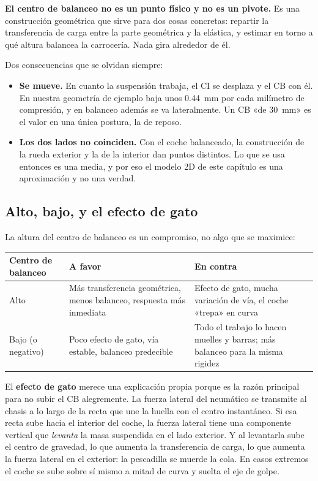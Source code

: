 \begin{ojo}
\textbf{El centro de balanceo no es un punto físico y no es un pivote.} Es una
construcción geométrica que sirve para dos cosas concretas: repartir la
transferencia de carga entre la parte geométrica y la elástica, y estimar en
torno a qué altura balancea la carrocería. Nada gira alrededor de él.

Dos consecuencias que se olvidan siempre:

\begin{itemize}
  \item \textbf{Se mueve.} En cuanto la suspensión trabaja, el CI se desplaza y
        el CB con él. En nuestra geometría de ejemplo baja unos
        \SI{0.44}{\milli\meter} por cada milímetro de compresión, y en balanceo
        además se va lateralmente. Un CB «de \SI{30}{\milli\meter}» es el valor
        en una única postura, la de reposo.
  \item \textbf{Los dos lados no coinciden.} Con el coche balanceado, la
        construcción de la rueda exterior y la de la interior dan puntos
        distintos. Lo que se usa entonces es una media, y por eso el modelo 2D
        de este capítulo es una aproximación y no una verdad.
\end{itemize}
\end{ojo}

\subsection{Alto, bajo, y el efecto de gato}

La altura del centro de balanceo es un compromiso, no algo que se maximice:

\begin{center}
\begin{tabularx}{\textwidth}{@{}lXX@{}}
\toprule
\textbf{Centro de balanceo} & \textbf{A favor} & \textbf{En contra} \\
\midrule
Alto & Más transferencia geométrica, menos balanceo, respuesta más inmediata &
  Efecto de gato, mucha variación de vía, el coche «trepa» en curva \\
Bajo (o negativo) & Poco efecto de gato, vía estable, balanceo predecible &
  Todo el trabajo lo hacen muelles y barras; más balanceo para la misma
  rigidez \\
\bottomrule
\end{tabularx}
\end{center}

El \textbf{efecto de gato} merece una explicación propia porque es la razón
principal para no subir el CB alegremente. La fuerza lateral del neumático se
transmite al chasis a lo largo de la recta que une la huella con el centro
instantáneo. Si esa recta sube hacia el interior del coche, la fuerza lateral
tiene una componente vertical que \emph{levanta} la masa suspendida en el lado
exterior. Y al levantarla sube el centro de gravedad, lo que aumenta la
transferencia de carga, lo que aumenta la fuerza lateral en el exterior: la
pescadilla se muerde la cola. En casos extremos el coche se sube sobre sí mismo
a mitad de curva y suelta el eje de golpe.

